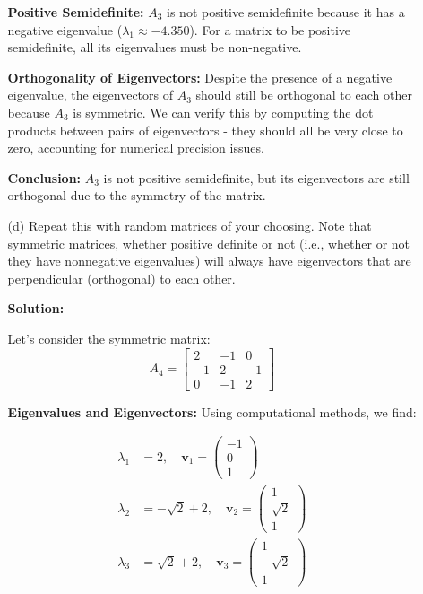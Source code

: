 \documentclass{article}
\begin{document}
\begin{enumerate}
\begin{enumerate}
    \textbf{Positive Semidefinite:}
    $A_3$ is not positive semidefinite because it has a negative eigenvalue ($\lambda_1 \approx -4.350$). For a matrix to be positive semidefinite, all its eigenvalues must be non-negative.

    \textbf{Orthogonality of Eigenvectors:}
    Despite the presence of a negative eigenvalue, the eigenvectors of $A_3$ should still be orthogonal to each other because $A_3$ is symmetric. We can verify this by computing the dot products between pairs of eigenvectors - they should all be very close to zero, accounting for numerical precision issues.

    \textbf{Conclusion:}
    $A_3$ is not positive semidefinite, but its eigenvectors are still orthogonal due to the symmetry of the matrix.

    \item[(d)] Repeat this with random matrices of your choosing. Note that symmetric matrices, whether positive definite or not (i.e., whether or not they have nonnegative eigenvalues) will always have eigenvectors that are perpendicular (orthogonal) to each other.

    \textbf{Solution:}

    Let's consider the symmetric matrix:
    \[
    A_4 = \begin{bmatrix}
    2 & -1 & 0 \\
    -1 & 2 & -1 \\
    0 & -1 & 2
    \end{bmatrix}
    \]

    \textbf{Eigenvalues and Eigenvectors:}
    Using computational methods, we find:

    \begin{align*}
    \lambda_1 &= 2, \quad \mathbf{v}_1 = \begin{pmatrix} -1 \\ 0 \\ 1 \end{pmatrix} \\[10pt]
    \lambda_2 &= -\sqrt{2} + 2, \quad \mathbf{v}_2 = \begin{pmatrix} 1 \\ \sqrt{2} \\ 1 \end{pmatrix} \\[10pt]
    \lambda_3 &= \sqrt{2} + 2, \quad \mathbf{v}_3 = \begin{pmatrix} 1 \\ -\sqrt{2} \\ 1 \end{pmatrix}
    \end{align*}


\end{enumerate}
\end{enumerate}
\end{document}
